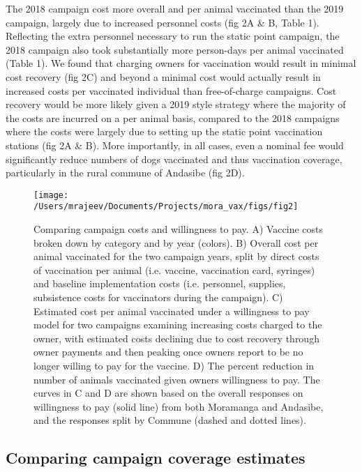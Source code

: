\documentclass[tropicalmed,article,submit,moreauthors,pdftex]{mdpi}
\begin{document}
The 2018 campaign cost more overall and per animal vaccinated than the
2019 campaign, largely due to increased personnel costs (fig 2A \& B,
Table 1). Reflecting the extra personnel necessary to run the static
point campaign, the 2018 campaign also took substantially more
person-days per animal vaccinated (Table 1). We found that charging
owners for vaccination would result in minimal cost recovery (fig 2C)
and beyond a minimal cost would actually result in increased costs per
vaccinated individual than free-of-charge campaigns. Cost recovery would
be more likely given a 2019 style strategy where the majority of the
costs are incurred on a per animal basis, compared to the 2018 campaigns
where the costs were largely due to setting up the static point
vaccination stations (fig 2A \& B). More importantly, in all cases, even
a nominal fee would significantly reduce numbers of dogs vaccinated and
thus vaccination coverage, particularly in the rural commune of Andasibe
(fig 2D).

\begin{figure}
\texttt{[image: /Users/mrajeev/Documents/Projects/mora\_vax/figs/fig2]} \caption{Comparing campaign costs and willingness to pay. A) Vaccine costs broken down by category and by year (colors). B) Overall cost per animal vaccinated for the two campaign years, split by direct costs of vaccination per animal (i.e. vaccine, vaccination card, syringes) and baseline implementation costs (i.e. personnel, supplies, subsistence costs for vaccinators during the campaign). C) Estimated cost per animal vaccinated under a willingness to pay model for two campaigns examining increasing costs charged to the owner, with estimated costs declining due to cost recovery through owner payments and then peaking once owners report to be no longer willing to pay for the vaccine. D) The percent reduction in number of animals vaccinated given owners willingness to pay. The curves in C and D are shown based on the overall responses on willingness to pay (solid line) from both Moramanga and Andasibe, and the responses split by Commune (dashed and dotted lines).}\label{fig:fig2}
\end{figure}

\hypertarget{comparing-campaign-coverage-estimates}{%
\subsection{Comparing campaign coverage
estimates}\label{comparing-campaign-coverage-estimates}}
\end{document}
